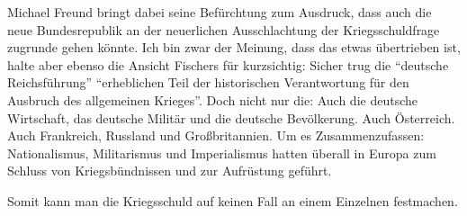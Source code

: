 Michael Freund bringt dabei seine Befürchtung zum Ausdruck, dass auch
die neue Bundesrepublik an der neuerlichen Ausschlachtung der
Kriegsschuldfrage zugrunde gehen könnte. Ich bin zwar der Meinung,
dass das etwas übertrieben ist, halte aber ebenso die Ansicht Fischers
für kurzsichtig: Sicher trug die \enquote{deutsche Reichsführung}
\enquote{erheblichen Teil der historischen Verantwortung für den
Ausbruch des allgemeinen Krieges}. Doch nicht nur die: Auch die
deutsche Wirtschaft, das deutsche Militär und die deutsche
Bevölkerung. Auch Österreich. Auch Frankreich, Russland und
Großbritannien. Um es Zusammenzufassen: Nationalismus, Militarismus
und Imperialismus hatten überall in Europa zum Schluss von
Kriegsbündnissen und zur Aufrüstung geführt.

Somit kann man die Kriegsschuld auf keinen Fall an einem Einzelnen
festmachen.



\endinput
